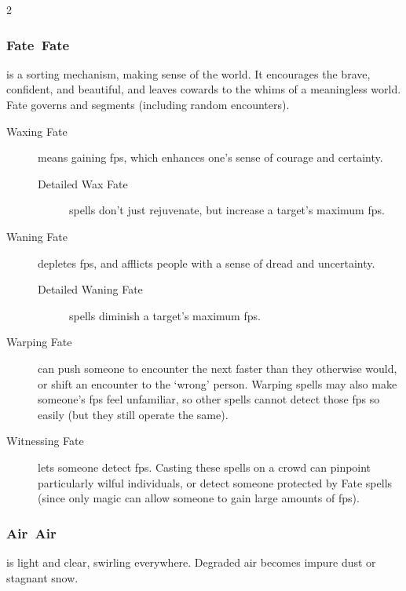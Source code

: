 \begin{multicols}{2}
\subsubsection[Fate]{\gls{Fate}~Fate}
is a sorting mechanism, making sense of the world.
It encourages the brave, confident, and beautiful, and leaves cowards to the whims of a meaningless world.
Fate governs  and \glspl{segment} (including random encounters).

\begin{description}
  \item[Waxing Fate]
  means gaining \glspl{fp}, which enhances one's sense of courage and certainty.

  \begin{description}
    \item[Detailed Wax Fate]
    \glspl{spell} don't just rejuvenate, but increase a target's maximum \glspl{fp}.
  \end{description}

  \item[Waning Fate]
  depletes \glspl{fp}, and afflicts people with a sense of dread and uncertainty.

  \begin{description}
    \item[Detailed Waning Fate]
    \glspl{spell} diminish a target's maximum \glspl{fp}.
  \end{description}

  \item[Warping Fate]
  can push someone to encounter the next  faster than they otherwise would, or shift an encounter to the `wrong' person.
  Warping \glspl{spell} may also make someone's \glspl{fp} feel unfamiliar, so other \glspl{spell} cannot detect those \glspl{fp} so easily (but they still operate the same).

  \item[Witnessing Fate]
  lets someone detect \glspl{fp}.
  Casting these \glspl{spell} on a crowd can pinpoint particularly wilful individuals, or detect someone protected by Fate \glspl{spell} (since only magic can allow someone to gain large amounts of \glspl{fp}).
\end{description}

\subsubsection[Air]{\gls{Air}~Air}
is light and clear, swirling everywhere.
Degraded air becomes impure dust or stagnant snow.


\end{multicols}
